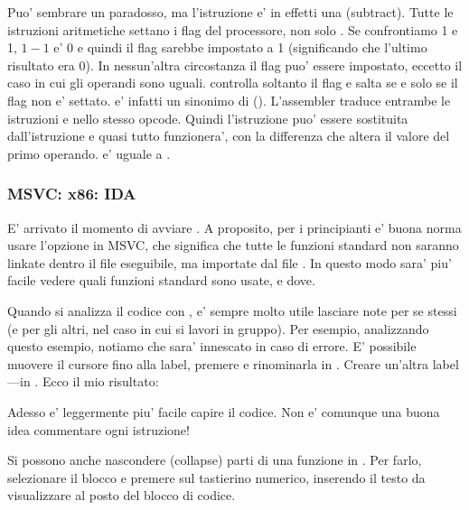 \label{CMPandSUB}
Puo' sembrare un paradosso, ma l'istruzione \CMP e' in effetti una \SUB (subtract).
Tutte le istruzioni aritmetiche settano i flag del processore, non solo \CMP.
Se confrontiamo 1 e 1, $1-1$ e' 0 e quindi il flag \ZF sarebbe impostato a 1 (significando che l'ultimo risultato era 0).
In nessun'altra circostanza il flag \ZF puo' essere impostato, eccetto il caso in cui gli operandi sono uguali.
\JNE controlla soltanto il flag \ZF e salta se e solo se il flag non e' settato.  \JNE e' infatti un sinonimo di \JNZ ().
L'assembler traduce entrambe le istruzioni \JNE e \JNZ nello stesso opcode.
Quindi l'istruzione \CMP puo' essere sostituita dall'istruzione \SUB e quasi tutto funzionera', con la differenza che \SUB altera il valore del primo operando.
\CMP e' uguale a .

\subsubsection{MSVC: x86: IDA}

E' arrivato il momento di avviare \IDA. A proposito, per i principianti e' buona norma usare l'opzione  in MSVC, che significa che tutte le funzioni
standard non saranno linkate dentro il file eseguibile, ma importate dal file .
In questo modo sara' piu' facile vedere quali funzioni standard sono usate, e dove.

Quando si analizza il codice con \IDA, e' sempre molto utile lasciare note per se stessi (e per gli altri, nel caso in cui si lavori in gruppo).
Per esempio, analizzando questo esempio, notiamo che 
 sara' innescato in caso di errore.
E' possibile muovere il cursore fino alla label, premere  e rinominarla in .
Creare un'altra label ---in .
Ecco il mio risultato:



Adesso e' leggermente piu' facile capire il codice.
Non e' comunque una buona idea commentare ogni istruzione!

Si possono anche nascondere (collapse) parti di una funzione in \IDA.
Per farlo, selezionare il blocco e premere \q{--} sul tastierino numerico, inserendo il testo da visualizzare al posto del blocco di codice.


